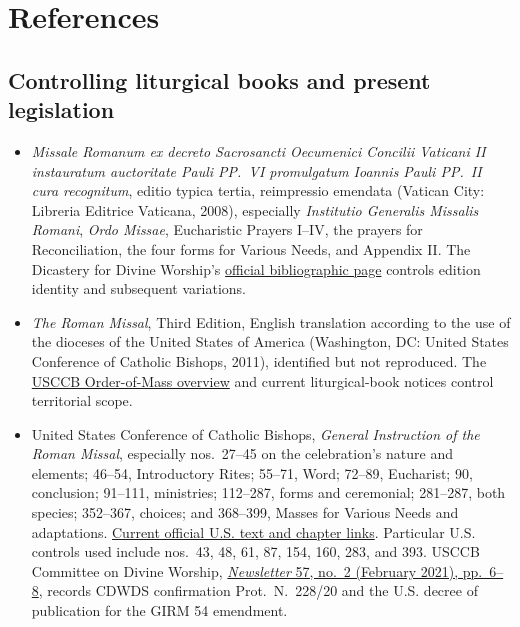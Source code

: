 \section{References}

\begingroup\footnotesize

\subsection{Controlling liturgical books and present legislation}

\begin{itemize}
  \item \emph{Missale Romanum ex decreto Sacrosancti Oecumenici Concilii Vaticani II instauratum auctoritate Pauli PP.~VI promulgatum Ioannis Pauli PP.~II cura recognitum}, editio typica tertia, reimpressio emendata (Vatican City: Libreria Editrice Vaticana, 2008), especially \emph{Institutio Generalis Missalis Romani}, \emph{Ordo Missae}, Eucharistic Prayers I--IV, the prayers for Reconciliation, the four forms for Various Needs, and Appendix II\@. The Dicastery for Divine Worship's \href{https://www.cultodivino.va/en/formazione/pubblicazioni/libri-liturgici/missale/missale-romanum.html}{official bibliographic page} controls edition identity and subsequent variations.
  \item \emph{The Roman Missal}, Third Edition, English translation according to the use of the dioceses of the United States of America (Washington, DC: United States Conference of Catholic Bishops, 2011), identified but not reproduced. The \href{https://www.usccb.org/prayer-and-worship/the-mass/order-of-mass}{USCCB Order-of-Mass overview} and current liturgical-book notices control territorial scope.
  \item United States Conference of Catholic Bishops, \emph{General Instruction of the Roman Missal}, especially nos.~27--45 on the celebration's nature and elements; 46--54, Introductory Rites; 55--71, Word; 72--89, Eucharist; 90, conclusion; 91--111, ministries; 112--287, forms and ceremonial; 281--287, both species; 352--367, choices; and 368--399, Masses for Various Needs and adaptations. \href{https://www.usccb.org/prayer-and-worship/the-mass/general-instruction-of-the-roman-missal}{Current official U.S. text and chapter links}. Particular U.S. controls used include nos.~43, 48, 61, 87, 154, 160, 283, and 393. USCCB Committee on Divine Worship, \href{https://www.usccb.org/resources/newsletter-2021-02.pdf}{\emph{Newsletter} 57, no.~2 (February 2021), pp.~6--8}, records CDWDS confirmation Prot.~N.~228/20 and the U.S. decree of publication for the GIRM 54 emendment.

\end{itemize}
